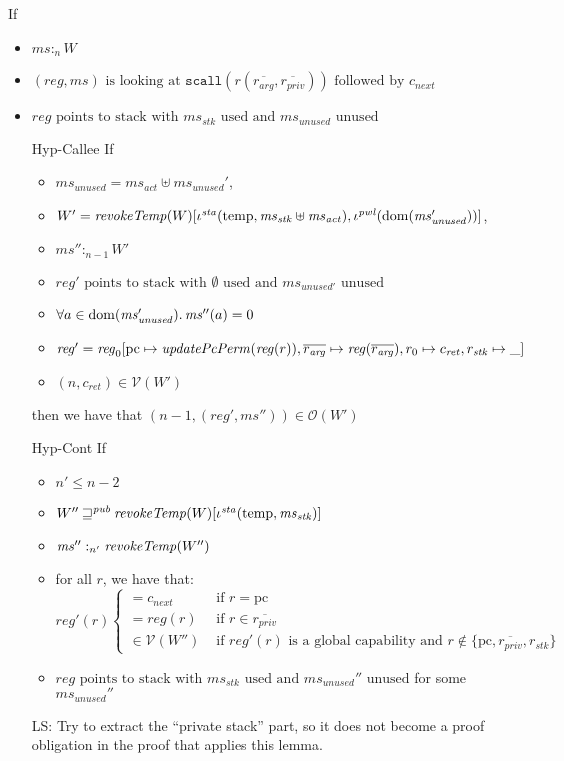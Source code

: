 \documentclass[a4paper]{article}
\DeclareMathOperator{\dom}{dom}
\newcommand\lau[1]{{\color{purple} \sf \footnotesize {LS: #1}}\\}
\newcommand{\var}[1]{\mathit{#1}}
\newcommand{\hs}{\var{ms}}
\newcommand{\ms}{\hs}
\newcommand{\pcreg}{\mathrm{pc}}
\newcommand{\reg}{\var{reg}}
\newcommand{\heap}{\var{mem}}
\newcommand{\stk}{\var{stk}}
\newcommand{\pwl}{\var{pwl}}
\newcommand{\sta}{\var{sta}}
\newcommand{\plainfun}[2]{
  \ifthenelse{\equal{#2}{}}
  {\mathit{#1}}
  {\mathit{#1}(#2)}
}
\newcommand{\updatePcPerm}[1]{\plainfun{updatePcPerm}{#1}}
\newcommand{\revokeTemp}[1]{\plainfun{revokeTemp}{#1}}
\newcommand{\futurewk}{\mathbin{\sqsupseteq}^{\var{pub}}}
\newcommand{\heapSat}[3][\heap]{#1 :_{#2} #3}
\newcommand{\memSat}[3][n]{\heapSat[#2]{#1}{#3}}
\newcommand{\asmType}{\plaindom{AsmType}}
\newcommand{\plaindom}[1]{\mathrm{#1}}
\newcommand{\intr}[2]{\mathcal{#1}}
\newcommand{\valueintr}[1]{\intr{V}{#1}}
\newcommand{\stdvr}{\valueintr{\asmType}}
\newcommand{\observations}{\mathcal{O}}
\newcommand{\plainview}[1]{\mathrm{#1}}
\newcommand{\temp}{\plainview{temp}}
\begin{document}
\begin{lemma}
  If
  \begin{itemize}
  \item $\heapSat[\ms]{n}{W}$ 
  \item $(\reg,\ms) \text{ is looking at }
    \mathtt{scall}(r(\overline{r_{\mathit{arg}}},
    \overline{r_{\mathit{priv}}})) \text{ followed by } c_{\mathit{next}}$
  \item $\reg \text{ points to stack with $\ms_\stk$ used and $\ms_{\mathit{unused}}$ unused}$
  \item[Hyp-Callee] If
    \begin{itemize}
    \item $\ms_{\mathit{unused}} = \ms_{\mathit{act}}
      \uplus \ms_{\mathit{unused}}'$,
    \item $W' =
      \revokeTemp{W}[\iota^{\sta}(\temp,\ms_\stk\uplus\ms_{\mathit{act}}),\iota^{\pwl}(\dom(\ms_{\mathit{unused}}'))]$,
    \item $\memSat[n-1]{\ms''}{W'}$
    \item $\reg' \text{ points to stack with $\emptyset$ used and $\ms_{\mathit{unused}'}$ unused}$
    \item $\forall a \in \dom(\ms_{\var{unused}}') \ldotp \ms''(a) = 0$
    \item $\reg'= \reg_0[\pcreg\mapsto\updatePcPerm{\reg(r)},
      \overline{r_{\mathit{arg}}} \mapsto \reg(\overline{r_{\mathit{arg}}}),r_0
      \mapsto c_{\mathit{ret}}, r_\stk \mapsto \_]$ 
    \item $(n,c_{\mathit{ret}}) \in \stdvr(W')$
    \end{itemize}
    then we have that $(n-1,(\reg',\ms'')) \in \observations(W')$
  \item[Hyp-Cont] If
    \begin{itemize}
    \item $n' \leq n-2$
    \item $W'' \futurewk \revokeTemp{W}[\iota^{\sta}(\temp,\ms_\stk)]$
    \item $\memSat[n']{\ms''}{\revokeTemp{W''}}$ 
    \item for all $r$, we have that:
      \begin{equation*}
        \reg'(r)
        \begin{cases}
          = c_{\mathit{next}} &\text{ if } r = \pcreg\\
          = \reg(r)&\text{ if } r \in \overline{r_{\mathit{priv}}}\\
          \in \stdvr(W'') &\text{ if $\reg'(r)$ is a global capability and } r \not\in \{\pcreg,\overline{r_{\mathit{priv}}}, r_\stk\} %
        \end{cases}
      \end{equation*}
    \item $\reg \text{ points to stack with $\ms_\stk$ used and $\ms_{\mathit{unused}}''$ unused}$ for some $\ms_{\mathit{unused}}''$
    \end{itemize}
\lau{Try to extract the ``private stack'' part, so it does not become a proof obligation in the proof that applies this lemma.}


\end{itemize}
\end{lemma}
\end{document}
